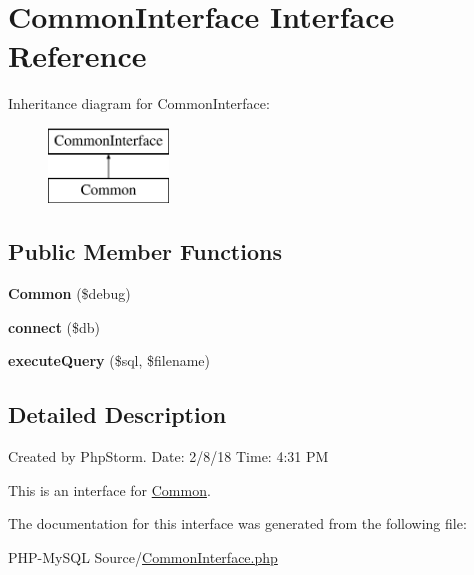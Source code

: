 \hypertarget{interface_common_interface}{}\section{Common\+Interface Interface Reference}
\label{interface_common_interface}
Inheritance diagram for Common\+Interface\+:\begin{figure}[H]
\begin{center}
\leavevmode
\includegraphics[height=2.000000cm]{interface_common_interface}
\end{center}
\end{figure}
\subsection*{Public Member Functions}
\begin{DoxyCompactItemize}
\item 
{\bfseries Common} (\$debug)\hypertarget{interface_common_interface_a4a9e6769ab6c946d0895e8d987df1c10}{}\label{interface_common_interface_a4a9e6769ab6c946d0895e8d987df1c10}

\item 
{\bfseries connect} (\$db)\hypertarget{interface_common_interface_a1b1bd9b3f45a5fbd2549355282cdc96f}{}\label{interface_common_interface_a1b1bd9b3f45a5fbd2549355282cdc96f}

\item 
{\bfseries execute\+Query} (\$sql, \$filename)\hypertarget{interface_common_interface_a57a9dbd1203cf7b3ef3c5ce40d4047cc}{}\label{interface_common_interface_a57a9dbd1203cf7b3ef3c5ce40d4047cc}

\end{DoxyCompactItemize}


\subsection{Detailed Description}
Created by Php\+Storm. Date\+: 2/8/18 Time\+: 4\+:31 PM

This is an interface for \hyperlink{class_common}{Common}. 

The documentation for this interface was generated from the following file\+:\begin{DoxyCompactItemize}
\item 
P\+H\+P-\/\+My\+S\+Q\+L Source/\hyperlink{_common_interface_8php}{Common\+Interface.\+php}\end{DoxyCompactItemize}
